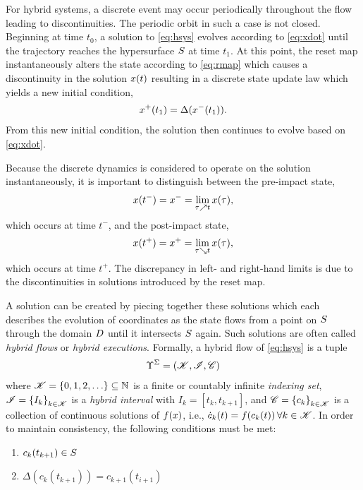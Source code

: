 For hybrid systems, a discrete event may occur periodically throughout the flow
leading to discontinuities.
%
The periodic orbit in such a case is not closed.
%
Beginning at time $t_{0}$, a solution to \eqref{eq:hsys} evolves according to
\eqref{eq:xdot} until the trajectory reaches the hypersurface $S$ at time
$t_{1}$.
%
At this point, the reset map instantaneously alters the state according to
\eqref{eq:rmap} which causes a discontinuity in the solution $x(t)$ resulting
in a discrete state update law which yields a new initial condition,
\begin{align*}
  x^{+}(t_{1}) = \Delta(x^{-}(t_{1})).
\end{align*}
%
From this new initial condition, the solution then continues to evolve based on
\eqref{eq:xdot}.

Because the discrete dynamics is considered to operate on the solution
instantaneously, it is important to distinguish between the pre-impact state,
\begin{align*}
  x(t^{-}) = x^{-} = \lim_{\tau \nearrow t} x(\tau),
\end{align*}
which occurs at time $t^{-}$, and the post-impact state,
\begin{align*}
  x(t^{+}) = x^{+} = \lim_{\tau \searrow t} x(\tau),
\end{align*}
which occurs at time $t^{+}$.
%
The discrepancy in left- and right-hand limits is due to the discontinuities in
solutions introduced by the reset map.
%

A solution can be created by piecing together these solutions which each
describes the evolution of coordinates as the state flows from a point on
$S$ through the domain $D$ until it intersects $S$ again.
%
Such solutions are often called {\em hybrid flows} or {\em hybrid executions}.
%
Formally, a hybrid flow of \eqref{eq:hsys} is a tuple
\begin{align*}
  \Upsilon^{\Sigma} = \left( \mathscr{K}, \mathscr{I}, \mathscr{C} \right)
\end{align*}
where $\mathscr{K} = \{0, 1, 2, \ldots\} \subseteq \mathbb{N}$ is a finite or countably
infinite {\em indexing set}, $\mathscr{I} = \left\{I_{k}\right\}_{k \in \mathscr{K}}$ is a {\em
  hybrid interval} with $I_{k} = \left[t_{k}, t_{k+1}\right]$, and $\mathscr{C} =
\left\{c_{k}\right\}_{k \in \mathscr{K}}$ is a collection of continuous solutions of
$f(x)$, i.e., ${\dot c}_{k}(t) = f(c_{k}(t)) \, \forall k \in \mathscr{K}$.
%
In order to maintain consistency, the following conditions must be met:
%
\begin{enumerate}
\item $c_{k}(t_{k+1}) \in S$
\item $\Delta(c_{k}(t_{k+1})) = c_{k+1}(t_{i+1})$
\end{enumerate}

